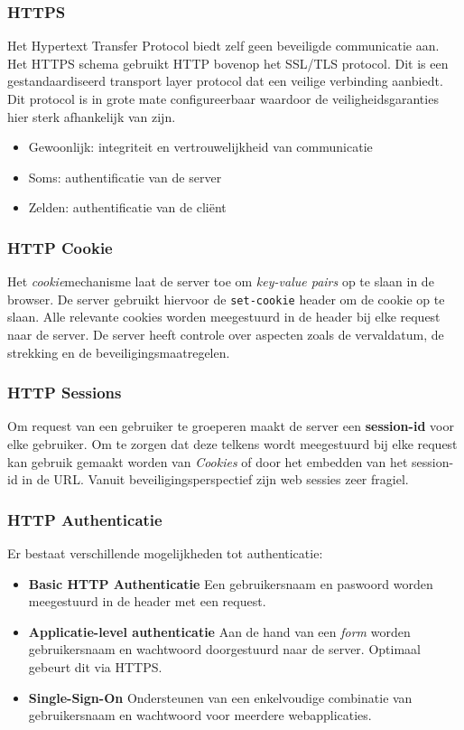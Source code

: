 \documentclass[../main.tex]{subfiles}
\begin{document}
\subsubsection{HTTPS}
Het Hypertext Transfer Protocol biedt zelf geen beveiligde communicatie aan. Het HTTPS schema gebruikt HTTP bovenop het SSL/TLS protocol. Dit is een gestandaardiseerd transport layer protocol dat een veilige verbinding aanbiedt. Dit protocol is in grote mate configureerbaar waardoor de veiligheidsgaranties hier sterk afhankelijk van zijn.
\begin{itemize}
	\item Gewoonlijk: integriteit en vertrouwelijkheid van communicatie
	\item Soms: authentificatie van de server
	\item Zelden: authentificatie van de cli\"ent
\end{itemize}

\subsubsection{HTTP Cookie}
Het \textit{cookie}mechanisme laat de server toe om \textit{key-value pairs} op te slaan in de browser. De server gebruikt hiervoor de \texttt{set-cookie} header om de cookie op te slaan. Alle relevante cookies worden meegestuurd in de header bij elke request naar de server. De server heeft controle over aspecten zoals de vervaldatum, de strekking en de beveiligingsmaatregelen.

\subsubsection{HTTP Sessions}
Om request van een gebruiker te groeperen maakt de server een \textbf{session-id} voor elke gebruiker. Om te zorgen dat deze telkens wordt meegestuurd bij elke request kan gebruik gemaakt worden van \textit{Cookies} of door het embedden van het session-id in de URL. Vanuit beveiligingsperspectief zijn web sessies zeer fragiel.  

\subsubsection{HTTP Authenticatie}
Er bestaat verschillende mogelijkheden tot authenticatie:
\begin{itemize}
	\item \textbf{Basic HTTP Authenticatie} Een gebruikersnaam en paswoord worden meegestuurd in de header met een request.
	\item \textbf{Applicatie-level authenticatie} Aan de hand van een \textit{form} worden gebruikersnaam en wachtwoord doorgestuurd naar de server. Optimaal gebeurt dit via HTTPS.
	\item \textbf{Single-Sign-On} Ondersteunen van een enkelvoudige combinatie van gebruikersnaam en wachtwoord voor meerdere webapplicaties.
\end{itemize}
\end{document}
